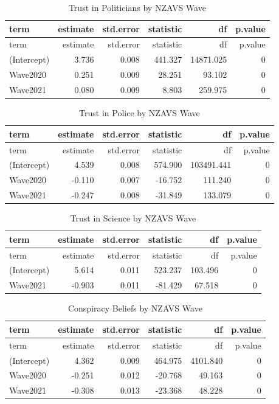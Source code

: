 \documentclass[
  singlecolumn]{report}
\begin{document}
\begin{longtable}[]{@{}lrrrrr@{}}
\caption{Trust in Politicians by NZAVS Wave }\tabularnewline
\toprule\noalign{}
term & estimate & std.error & statistic & df & p.value \\
\midrule\noalign{}
\endfirsthead
\toprule\noalign{}
term & estimate & std.error & statistic & df & p.value \\
\midrule\noalign{}
\endhead
\bottomrule\noalign{}
\endlastfoot
(Intercept) & 3.736 & 0.008 & 441.327 & 14871.025 & 0 \\
Wave2020 & 0.251 & 0.009 & 28.251 & 93.102 & 0 \\
Wave2021 & 0.080 & 0.009 & 8.803 & 259.975 & 0 \\
\end{longtable}

\begin{longtable}[]{@{}lrrrrr@{}}
\caption{Trust in Police by NZAVS Wave }\tabularnewline
\toprule\noalign{}
term & estimate & std.error & statistic & df & p.value \\
\midrule\noalign{}
\endfirsthead
\toprule\noalign{}
term & estimate & std.error & statistic & df & p.value \\
\midrule\noalign{}
\endhead
\bottomrule\noalign{}
\endlastfoot
(Intercept) & 4.539 & 0.008 & 574.900 & 103491.441 & 0 \\
Wave2020 & -0.110 & 0.007 & -16.752 & 111.240 & 0 \\
Wave2021 & -0.247 & 0.008 & -31.849 & 133.079 & 0 \\
\end{longtable}

\begin{longtable}[]{@{}lrrrrr@{}}
\caption{Trust in Science by NZAVS Wave }\tabularnewline
\toprule\noalign{}
term & estimate & std.error & statistic & df & p.value \\
\midrule\noalign{}
\endfirsthead
\toprule\noalign{}
term & estimate & std.error & statistic & df & p.value \\
\midrule\noalign{}
\endhead
\bottomrule\noalign{}
\endlastfoot
(Intercept) & 5.614 & 0.011 & 523.237 & 103.496 & 0 \\
Wave2021 & -0.903 & 0.011 & -81.429 & 67.518 & 0 \\
\end{longtable}

\begin{longtable}[]{@{}lrrrrr@{}}
\caption{Conspiracy Beliefs by NZAVS Wave }\tabularnewline
\toprule\noalign{}
term & estimate & std.error & statistic & df & p.value \\
\midrule\noalign{}
\endfirsthead
\toprule\noalign{}
term & estimate & std.error & statistic & df & p.value \\
\midrule\noalign{}
\endhead
\bottomrule\noalign{}
\endlastfoot
(Intercept) & 4.362 & 0.009 & 464.975 & 4101.840 & 0 \\
Wave2020 & -0.251 & 0.012 & -20.768 & 49.163 & 0 \\
Wave2021 & -0.308 & 0.013 & -23.368 & 48.228 & 0 \\
\end{longtable}
\end{document}
